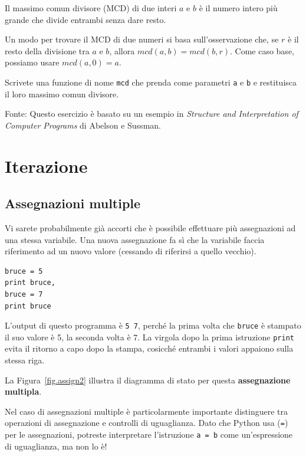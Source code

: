 \documentclass[10pt]{book}
\begin{document}
\vspace{0.2in}
\begin{exercise}

Il massimo comun divisore (MCD) di due interi $a$ e $b$ è il numero intero più grande che divide entrambi senza dare resto.  

Un modo per trovare il MCD di due numeri si basa sull'osservazione che, se $r$ è il resto della divisione tra $a$ e $b$, allora $mcd(a,
b) = mcd(b, r)$.  Come caso base, possiamo usare $mcd(a, 0) = a$.

Scrivete una funzione di nome
\verb"mcd" che prenda come parametri {\tt a} e {\tt b}
e restituisca il loro massimo comun divisore.

Fonte: Questo esercizio è basato su un esempio in {\em Structure and Interpretation of Computer Programs} di Abelson e Sussman.

\end{exercise}


\chapter{Iterazione}

\section{Assegnazioni multiple}

Vi sarete probabilmente già accorti che è possibile effettuare più assegnazioni ad una stessa variabile. Una nuova assegnazione fa sì che la variabile faccia riferimento ad un nuovo valore (cessando di riferirsi a quello vecchio).

\begin{verbatim}
bruce = 5
print bruce,
bruce = 7
print bruce
\end{verbatim}
%
L'output di questo programma è {\tt 5 7}, perché la prima volta che {\tt bruce} è stampato il suo valore è 5, la seconda volta è 7. La virgola dopo la prima istruzione {\tt print} evita il ritorno a capo dopo la stampa, cosicché entrambi i valori appaiono sulla stessa riga.

La Figura~\ref{fig.assign2} illustra il diagramma di stato per questa {\bf assegnazione multipla}. 

Nel caso di assegnazioni multiple è particolarmente importante distinguere tra operazioni di assegnazione e controlli di uguaglianza.
Dato che Python usa ({\tt =}) per le assegnazioni, potreste interpretare l'istruzione {\tt a = b} come un'espressione di uguaglianza, ma non lo è!
\end{document}
